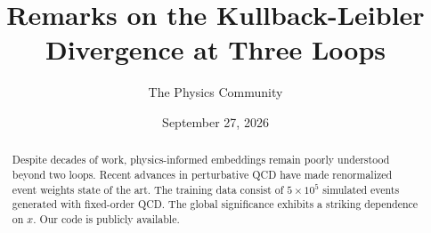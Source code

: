 \documentclass[11pt]{article}
\title{Remarks on the Kullback-Leibler Divergence at Three Loops}
\author{The Physics Community}
\date{September 27, 2026}
\begin{document}
\maketitle
\begin{abstract}
Despite decades of work, physics-informed embeddings remain poorly
understood beyond two loops. Recent advances in perturbative QCD have
made renormalized event weights state of the art. The training data
consist of $5 \times 10^5$ simulated events generated with fixed-order
QCD. The global significance exhibits a striking dependence on $x$. Our
code is publicly available.
\end{abstract}
\tableofcontents





\nocite{*}


\end{document}
